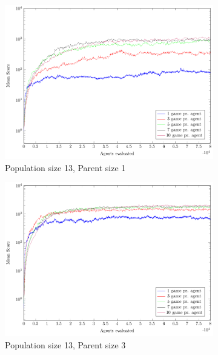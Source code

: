 \begin{figure}
	\centering
	\captionsetup[subfigure]{justification=centering}
    \begin{subfigure}[b]{0.49\textwidth}
    	\caption{Population size 13, Parent size 1}
        \includegraphics[width=\textwidth]{data/ce_population_offspring/13x_split/constant_l13_o1/mean/PlotFile.pdf}
    \end{subfigure} 
    \begin{subfigure}[b]{0.49\textwidth}
    	\caption{Population size 13, Parent size 3}
        \includegraphics[width=\textwidth]{data/ce_population_offspring/13x_split/constant_l13_o3/mean/PlotFile.pdf}
    \end{subfigure}
    \begin{subfigure}[b]{0.49\textwidth}

\end{subfigure}
\end{figure}

